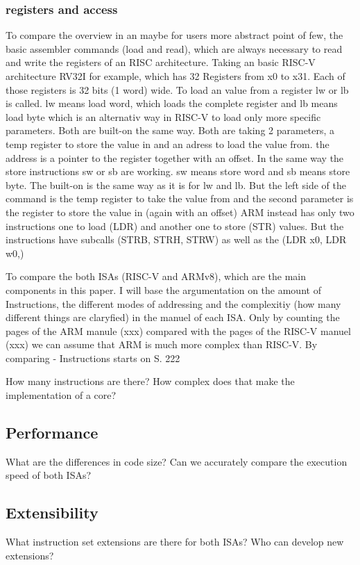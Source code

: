 \documentclass[conference]{IEEEtran}
\begin{document}
\subsubsection{registers and access}
To compare the overview in an maybe for users more abstract point of few, the basic assembler commands (load and read), which are always necessary to read and write the registers of an \gls{RISC} architecture. Taking an basic RISC-V architecture RV32I for example, which has 32 Registers from x0 to x31. Each of those registers is 32 bits (1 word) wide. 
To load an value from a register lw or lb is called. lw means load word, which loads the complete register and lb means load byte which is an alternativ way in RISC-V to load only more specific parameters. Both are built-on the same way. Both are taking 2 parameters, a temp register to store the value in and an adress to load the value from. the address is a pointer to the register together with an offset.
In the same way the store instructions sw or sb are working. sw means store word and sb means store byte. The built-on is the same way as it is for lw and lb. But the left side of the command is the temp register to take the value from and the second parameter is the register to store the value in (again with an offset) \cite{RISC-Assembly}
ARM instead has only two instructions one to load (LDR) and another one to store (STR) values. But the instructions have subcalls (STRB, STRH, STRW) as well as the (LDR x0, LDR w0,) 

	To compare the both \glspl{ISA} (RISC-V and ARMv8), which are the main components in this paper. I will base the argumentation on the amount of Instructions, the different modes 		of addressing and the complexitiy (how many different things are claryfied) in the manuel of each \gls{ISA}. 
	Only by counting the pages of the ARM manule (xxx) compared with the pages of the RISC-V manuel (xxx) we can assume that ARM is much more complex than RISC-V. By comparing 
	- Instructions starts on \cite{ArmManual} S. 222


	How many instructions are there? How complex does that make the implementation of a core?
	\subsection{Performance}
	What are the differences in code size? Can we accurately compare the execution speed of both ISAs?
	\subsection{Extensibility}
	What instruction set extensions are there for both ISAs? Who can develop new extensions?
\end{document}
